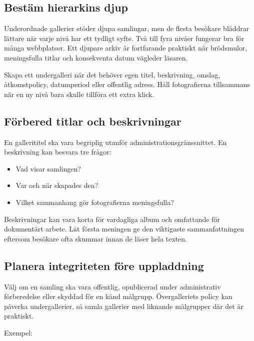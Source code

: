 \documentclass[11pt,a4paper]{article}
\begin{document}
\subsection{Bestäm hierarkins djup}

Underordnade gallerier stöder djupa samlingar, men de flesta besökare bläddrar
lättare när varje nivå har ett tydligt syfte. Två till fyra nivåer fungerar bra
för många webbplatser. Ett djupare arkiv är fortfarande praktiskt när
brödsmulor, meningsfulla titlar och konsekventa datum vägleder läsaren.

Skapa ett undergalleri när det behöver egen titel, beskrivning, omslag,
åtkomstpolicy, datumperiod eller offentlig adress. Håll fotografierna
tillsammans när en ny nivå bara skulle tillföra ett extra klick.

\subsection{Förbered titlar och beskrivningar}

En gallerititel ska vara begriplig utanför administrationsgränssnittet. En
beskrivning kan besvara tre frågor:

\begin{itemize}
  \item Vad visar samlingen?
  \item Var och när skapades den?
  \item Vilket sammanhang gör fotografierna meningsfulla?
\end{itemize}

Beskrivningar kan vara korta för vardagliga album och omfattande för dokumentärt
arbete. Låt första meningen ge den viktigaste sammanfattningen eftersom besökare
ofta skummar innan de läser hela texten.

\subsection{Planera integriteten före uppladdning}

Välj om en samling ska vara offentlig, opublicerad under administrativ
förberedelse eller skyddad för en känd målgrupp. Övergalleriets policy kan
påverka undergallerier, så samla gallerier med liknande målgrupper där det är
praktiskt.

Exempel:
\end{document}
